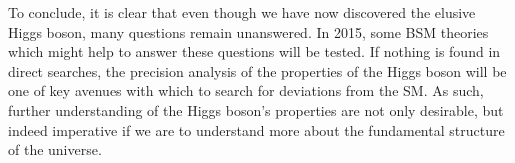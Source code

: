 \documentclass[10pt]{article}
\begin{document}
To conclude, it is clear that even though we have now discovered the elusive Higgs boson, many questions remain unanswered. In 2015, some BSM theories which might help to answer these questions will be tested. If nothing is found in direct searches, the precision analysis of the properties of the Higgs boson will be one of key avenues with which to search for deviations from the SM. As such, further understanding of the Higgs boson's properties are not only desirable, but indeed imperative if we are to understand more about the fundamental  structure of the universe.




\end{document}
